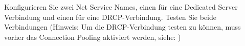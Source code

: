     \item Konfigurieren Sie zwei Net Service Names, einen für eine Dedicated Server Verbindung und einen für eine DRCP-Verbindung. Testen Sie beide Verbindungen (Hinweis: Um die DRCP-Verbindung testen zu können, muss vorher das Connection Pooling aktiviert werden, siehe: )
